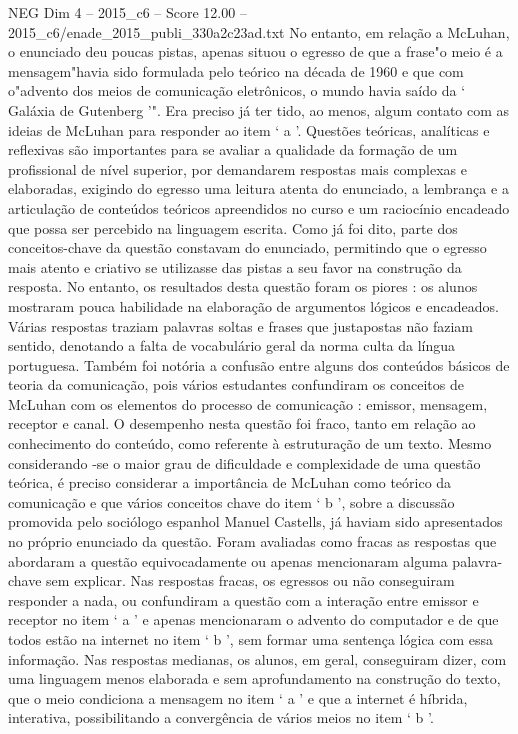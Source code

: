 \begin{textsample}{NEG Dim 4 – 2015\_c6 – Score 12.00 – 2015\_c6/enade\_2015\_publi\_330a2c23ad.txt}
No entanto, em relação a McLuhan, o enunciado deu poucas pistas, apenas situou o egresso de que a frase"o meio é a mensagem"havia sido formulada pelo teórico na década de 1960 e que com o"advento dos meios de comunicação eletrônicos, o mundo havia saído da ‘ Galáxia de Gutenberg ’".
Era preciso já ter tido, ao menos, algum contato com as ideias de McLuhan para responder ao item ‘ a ’.
Questões teóricas, analíticas e reflexivas são importantes para se avaliar a qualidade da formação de um profissional de nível superior, por demandarem respostas mais complexas e elaboradas, exigindo do egresso uma leitura atenta do enunciado, a lembrança e a articulação de conteúdos teóricos apreendidos no curso e um raciocínio encadeado que possa ser percebido na linguagem escrita.
Como já foi dito, parte dos conceitos-chave da questão constavam do enunciado, permitindo que o egresso mais atento e criativo se utilizasse das pistas a seu favor na construção da resposta.
No entanto, os resultados desta questão foram os piores : os alunos mostraram pouca habilidade na elaboração de argumentos lógicos e encadeados.
Várias respostas traziam palavras soltas e frases que justapostas não faziam sentido, denotando a falta de vocabulário geral da norma culta da língua portuguesa.
Também foi notória a confusão entre alguns dos conteúdos básicos de teoria da comunicação, pois vários estudantes confundiram os conceitos de McLuhan com os elementos do processo de comunicação : emissor, mensagem, receptor e canal.
O desempenho nesta questão foi fraco, tanto em relação ao conhecimento do conteúdo, como referente à estruturação de um texto.
Mesmo considerando -se o maior grau de dificuldade e complexidade de uma questão teórica, é preciso considerar a importância de McLuhan como teórico da comunicação e que vários conceitos chave do item ‘ b ’, sobre a discussão promovida pelo sociólogo espanhol Manuel Castells, já haviam sido apresentados no próprio enunciado da questão.
Foram avaliadas como fracas as respostas que abordaram a questão equivocadamente ou apenas mencionaram alguma palavra-chave sem explicar.
Nas respostas fracas, os egressos ou não conseguiram responder a nada, ou confundiram a questão com a interação entre emissor e receptor no item ‘ a ’ e apenas mencionaram o advento do computador e de que todos estão na internet no item ‘ b ’, sem formar uma sentença lógica com essa informação.
Nas respostas medianas, os alunos, em geral, conseguiram dizer, com uma linguagem menos elaborada e sem aprofundamento na construção do texto, que o meio condiciona a mensagem no item ‘ a ’ e que a internet é híbrida, interativa, possibilitando a convergência de vários meios no item ‘ b ’.

\end{textsample}
